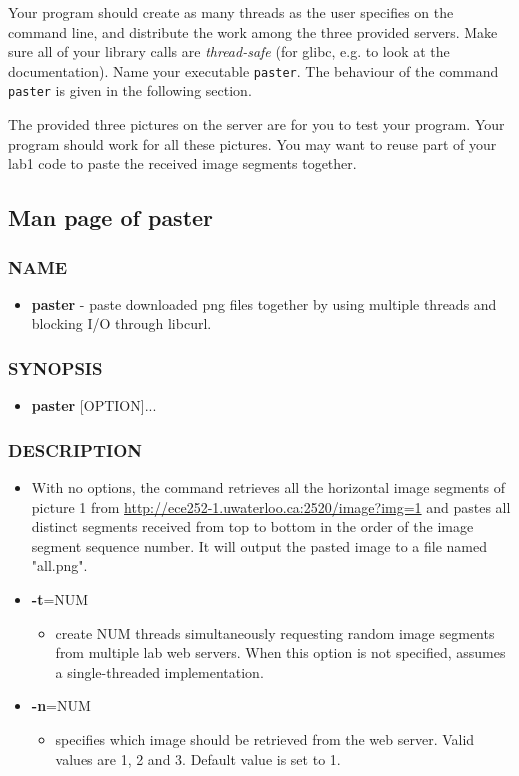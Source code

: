 Your program should create as many threads as the user specifies on the command line, and distribute the work among the three provided servers. Make sure all of your library  calls are {\em thread-safe} (for glibc, e.g.  to look at the documentation). Name your executable \verb+paster+. The behaviour of the command \verb+paster+ is given in the following section.

The provided three pictures on the server are for you to test your program. Your program should work for all these pictures. You may want to reuse part of your lab1 code to paste the received image segments together. 

\subsection{Man page of paster}
\label{sec:man_paster_par}

\subsubsection*{NAME}
\begin{itemize}
    \item[]{\bf paster} - paste downloaded png files together
        by using multiple threads and blocking I/O through libcurl.
\end{itemize}

\subsubsection*{SYNOPSIS}

\begin{itemize}
\item []{\bf paster} [OPTION]...
\end{itemize}

\subsubsection*{DESCRIPTION}

\begin{itemize}
\item []
  With no options, the command retrieves all the horizontal image segments of picture 1 from \url{http://ece252-1.uwaterloo.ca:2520/image?img=1} and pastes all distinct segments received from top to bottom in the order of the image segment sequence number. It will output the pasted image to a file named "all.png".
\item[] {\bf -t}=NUM
  \begin{itemize}
  \item[] create NUM threads simultaneously requesting random image segments from multiple lab web servers. When this option is not specified, assumes a single-threaded implementation.
  \end{itemize}
\item[] {\bf -n}=NUM
  \begin{itemize}
  \item[] specifies which image should be retrieved from the web server. Valid values are 1, 2 and 3. Default value is set to 1.
  \end{itemize}
\end{itemize}
